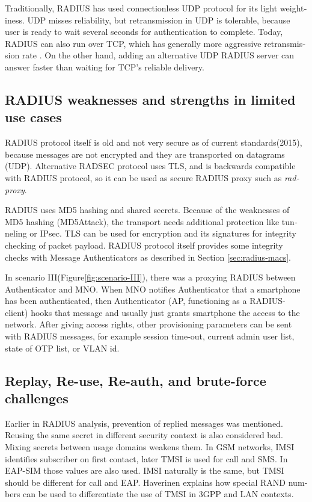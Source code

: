\documentclass[12pt,a4paper,english]{tutthesis}
\begin{document}
\begin{otherlanguage}{english}
Traditionally, RADIUS has used connection\-less UDP protocol for its
light weightiness. UDP misses reliability, but retransmission in UDP is
tolerable, because user is ready to wait several seconds for
authentication to complete. Today, RADIUS can also run over TCP, which
has generally more aggressive retransmission
rate \cite[Section 2.2.1]{rfc5080}. 
On the other hand, adding an
alternative UDP RADIUS server can answer faster than waiting for TCP's reliable delivery.


\subsection{RADIUS weaknesses and strengths in limited use cases}
\label{sec-6-5-4}


RADIUS protocol itself is old and not very secure as of current
standards(2015), because messages are not encrypted and they are
transported on datagrams (UDP). Alternative RADSEC protocol uses TLS, and 
is backwards compatible with RADIUS protocol, so it can be used
as secure RADIUS proxy such as \emph{radproxy}\cite{uninett-radproxy}.

RADIUS uses MD5 hashing and shared secrets. Because of the weaknesses of
MD5 hashing (MD5Attack\cite{rfc5176}), the transport needs additional
protection like tunneling or IPsec. TLS can be used for encryption and
its signatures for integrity checking of packet payload.
RADIUS protocol itself provides some integrity checks with Message
Authenticators as described in Section \ref{sec:radius-macs}.



In scenario III(Figure\ref{fig:scenario-III}),  there was a proxying RADIUS between Authenticator
and MNO.  When MNO notifies Authenticator
that a smartphone has been authenticated, then Authenticator (AP, functioning
as a RADIUS-client) hooks that message and usually just grants
smartphone the access to the network. After giving access rights, other
provisioning parameters can be sent with RADIUS messages, for example
session time-out,
current admin user list, state of OTP list, or VLAN id.


\subsection{Replay, Re-use, Re-auth, and brute-force challenges}
\label{sec-6-5-5}
Earlier in RADIUS analysis, prevention of replied messages was
mentioned. Reusing the same secret in different security context is also
considered bad.  Mixing secrets between usage
domains weakens them.  In GSM networks, IMSI identifies subscriber on
first contact, later TMSI is used for call and SMS.  In EAP-SIM those
values are also used. IMSI naturally is the same, but TMSI should be
different for call and EAP.  Haverinen\cite{hav-doc} explains how
special RAND numbers can be used to differentiate the use of TMSI in 3GPP and LAN
contexts.


\end{otherlanguage}
\end{document}

